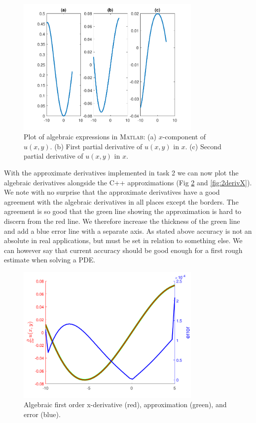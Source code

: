 \documentclass[paper=a4, fontsize=12pt]{article} %
\begin{document}
\begin{figure}[H]
  \centering
  \includegraphics[width=0.8\textwidth]{algebraicDeriv.pdf}
  \caption{\small Plot of algebraic expressions in \textsc{Matlab}: (a) $x$-component of $u(x,y)$. (b) First partial derivative of $u(x,y)$ in $x$. (c) Second partial derivative of $u(x,y)$ in $x$.\label{fig:algebraic}}
\end{figure}

With the approximate derivatives implemented in task 2 we can now plot the algebraic derivatives alongside the C++ approximations (Fig \ref{fig:1derivX} and \ref{fig:2derivX}).
We note with no surprise that the approximate derivatives have a good agreement with the algebraic derivatives in all places except the borders. The agreement is so good that the green line showing the approximation is hard to discern from the red line. We therefore increase the thickness of the green line and add a blue error line with a separate axis. As stated above accuracy is not an absolute in real applications, but must be set in relation to something else. We can however say that current accuracy should be good enough for a first rough estimate when solving a PDE.


\begin{figure}[H]
  \centering
  \includegraphics[width=0.8\textwidth]{comparison-x.pdf}
  \caption{\small Algebraic first order x-derivative (red), approximation (green), and error (blue).\label{fig:1derivX}}
\end{figure}
\end{document}
